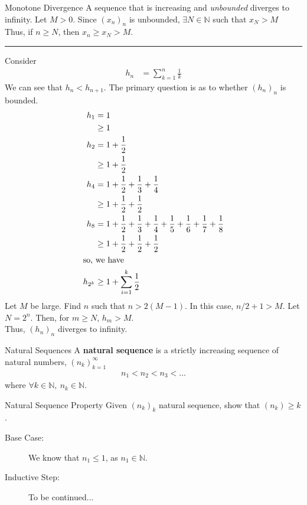 \documentclass[8pt]{extarticle}
\newcommand{\N}{\mathbb{N}}
\begin{document}
  \begin{problem}{Monotone Divergence}
    A sequence that is increasing and \textit{unbounded} diverges to infinity.
    \tcblower
    Let $M > 0$. Since $\left(x_{n}\right)_n$ is unbounded, $\exists N\in\N$ such that $x_{N} > M$\\

    Thus, if $n \geq N$, then $x_{n} \geq x_{N} > M$.\\
    \vspace{4pt}
    \rule{\textwidth}{0.4pt}
    \vspace{4pt}
    Consider
    \begin{align*}
      h_n &= \sum_{k=1}^{n} \frac{1}{k}
    \end{align*}
    We can see that $h_{n} < h_{n+1}$. The primary question is as to whether $(h_n)_n$ is bounded.
    \begin{align*}
      h_{1} &= 1 \\&\geq 1\\
      h_{2} &= 1 + \frac{1}{2}\\ &\geq 1 + \frac{1}{2}\\
      h_{4} &= 1 + \frac{1}{2} + \frac{1}{3} + \frac{1}{4}\\ &\geq 1 + \frac{1}{2} + \frac{1}{2}\\
      h_{8} &= 1 + \frac{1}{2} + \frac{1}{3} + \frac{1}{4} + \frac{1}{5} + \frac{1}{6} + \frac{1}{7} + \frac{1}{8}\\
            &\geq 1 + \frac{1}{2}  + \frac{1}{2} + \frac{1}{2}\\
            \shortintertext{so, we have}
      h_{2^k} &\geq 1 + \sum_{i=1}^{k}\frac{1}{2}\\
    \end{align*}
    Let $M$ be large. Find $n$ such that $n > 2(M-1)$. In this case, $n/2 + 1 > M$. Let $N = 2^n$. Then, for $m \geq N$, $h_{m} > M$.\\

    Thus, $(h_n)_n$ diverges to infinity.
  \end{problem}
  \begin{problem}{Natural Sequences}
    A \textbf{natural sequence} is a strictly increasing sequence of natural numbers, $(n_{k})_{k=1}^{\infty}$
    \begin{align*}
      n_{1} < n_2 < n_3<\dots
    \end{align*}
    where $\forall k\in\N,~n_k\in\N$.
    \begin{problem}{Natural Sequence Property}
      Given $(n_k)_k$ natural sequence, show that $(n_k) \geq k$.
      \tcblower
      \begin{description}
        \item[Base Case:] We know that $n_1 \leq 1$, as $n_1\in\N$.
        \item[Inductive Step:] To be continued...
      \end{description}
    \end{problem}
  \end{problem}
\end{document}
